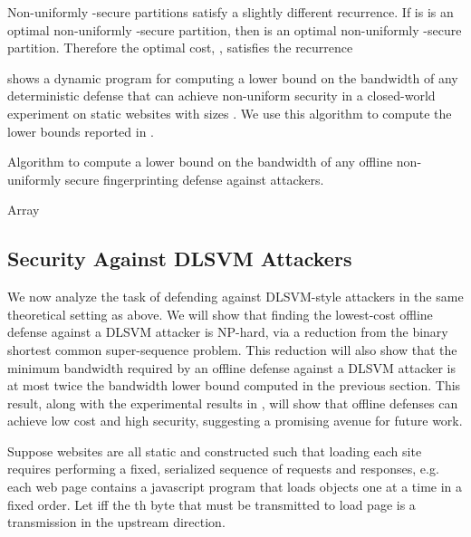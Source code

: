 \documentclass[10pt,journal]{IEEEtran}
\begin{document}
Non-uniformly -secure partitions satisfy a slightly
different recurrence.  If  is is an optimal
non-uniformly -secure partition, then 
is an optimal non-uniformly -secure partition.
Therefore the optimal cost, , satisfies the
recurrence


 shows a dynamic program for computing a lower bound on
the bandwidth of any deterministic defense that can achieve 
non-uniform security in a closed-world experiment on static websites
with sizes .  We use this algorithm to compute the
lower bounds reported in .

\begin{algorithm}[t]
  \caption{Algorithm to compute a lower bound on the bandwidth of any offline non-uniformly  secure fingerprinting defense against  attackers.}
  \label{alg:dp}
  \begin{algorithmic}
     \State Array 
    \For{}
	    \State 
    \EndFor
    \For{}
      \State 
    \EndFor
    \For{}
      \For{}
        \State 
	    \EndFor
	  \EndFor
	  \State \Return 
    \EndFunction
  \end{algorithmic}
\end{algorithm}

\subsection{Security Against DLSVM Attackers}

We now analyze the task of defending against DLSVM-style
attackers in the same theoretical setting as above.  We will show that
finding the lowest-cost offline defense against a DLSVM attacker
is NP-hard, via a reduction from the binary shortest common
super-sequence problem.  This reduction will also show that the
minimum bandwidth required by an offline defense against a DLSVM
attacker is at most twice the bandwidth lower bound computed in the
previous section.  This result, along with the experimental results in
, will show that offline defenses can achieve low
cost and high security, suggesting a promising avenue for future
work.

Suppose websites  are all static and constructed such
that loading each site requires performing a fixed, serialized
sequence of requests and responses, e.g. each web page contains a
javascript program that loads objects one at a time in a fixed order.
Let  iff the th byte that must be transmitted to load
page  is a transmission in the upstream direction.  
\end{document}
